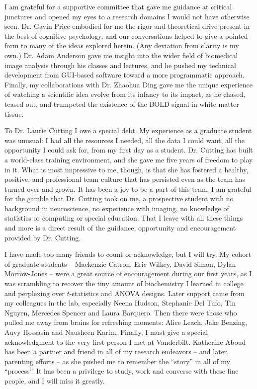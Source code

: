 \documentclass[12pt]{report}  %
\begin{document}
I am grateful for a supportive committee that gave me guidance at critical junctures and opened my eyes to a research domains I would not have otherwise seen. Dr. Gavin Price embodied for me the rigor and theoretical drive present in the best of cognitive psychology, and our conversations helped to give a pointed form to many of the ideas explored herein. (Any deviation from clarity is my own.) Dr. Adam Anderson gave me insight into the wider field of biomedical image analysis through his classes and lectures, and he pushed my technical development from GUI-based software toward a more programmatic approach. Finally, my collaborations with Dr. Zhaohua Ding gave me the unique experience of watching a scientific idea evolve from its infancy to its impact, as he chased, teased out, and trumpeted the existence of the BOLD signal in white matter tissue.

To Dr. Laurie Cutting I owe a special debt. My experience as a graduate student was unusual: I had all the resources I needed, all the data I could want, all the opportunity I could ask for, from my first day as a student. Dr. Cutting has built a world-class training environment, and she gave me five years of freedom to play in it. What is most impressive to me, though, is that she has fostered a healthy, positive, and professional team culture that has persisted even as the team has turned over and grown. It has been a joy to be a part of this team. I am grateful for the gamble that Dr. Cutting took on me, a prospective student with no background in neuroscience, no experience with imaging, no knowledge of statistics or computing or special education. That I leave with all these things and more is a direct result of the guidance, opportunity and encouragement provided by Dr. Cutting.

I have made too many friends to count or acknowledge, but I will try. My cohort of graduate students -- Mackenzie Catron, Eric Wilkey, David Simon, Dylan Morrow-Jones -- were a great source of encouragement during our first years, as I was scrambling to recover the tiny amount of biochemistry I learned in college and perplexing over $t$-statistics and ANOVA designs. Later support came from my colleagues in the lab, especially Neena Hudson, Stephanie Del Tufo, Tin Nguyen, Mercedes Spencer and Laura Barquero. Then there were those who pulled me away from brains for refreshing moments: Alice Leach, Jake Benzing, Auvy Hossasin and Nausheen Karim. Finally, I must give a special acknowledgment to the very first person I met at Vanderbilt. Katherine Aboud has been a partner and friend in all of my research endeavors -- and later, parenting efforts -- as she pushed me to remember the ``story'' in all of my ``process''. It has been a privilege to study, work and converse with these fine people, and I will miss it greatly. 
\end{document}
